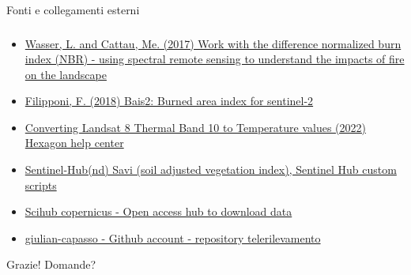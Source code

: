 \documentclass{beamer}
\begin{document}
\begin{frame}{Fonti e collegamenti esterni }
\frametitle{}
\begin{itemize}
\small 
\item \href{https://www.earthdatascience.org/courses/earth-analytics/multispectral-remote-sensing-modis/normalized-burn-index-dNBR/}{\scriptsize Wasser, L. and Cattau, Me. (2017) Work with the difference normalized burn index (NBR) - using spectral remote sensing to understand the impacts of fire on the landscape}
\item \href{https://www.mdpi.com/2504-3900/2/7/364}{\scriptsize Filipponi, F. (2018) Bais2: Burned area index for sentinel-2}
 \item \href{https://supportsi.hexagon.com/s/article/Converting-Landsat-8-Thermal-Band-10-to-Temperature-values?language=en_US}{\scriptsize Converting Landsat 8 Thermal Band 10 to Temperature values (2022) Hexagon help center}
\item \href{https://custom-scripts.sentinel-hub.com/custom-scripts/sentinel-2/savi/}{\scriptsize Sentinel-Hub(nd) Savi (soil adjusted vegetation index), Sentinel Hub custom scripts}
\item \href{https://scihub.copernicus.eu/dhus/#/home}{\scriptsize Scihub copernicus - Open access hub to download data}
\item \href{https://github.com/giulian-capasso/telerilevamento}{ \scriptsize giulian-capasso - Github account - repository telerilevamento}
\end{itemize}

\vspace{1.5cm}
\begin{center}
\scriptsize Grazie! 
Domande? 
\end{center}
\end{frame}
\end{document}
